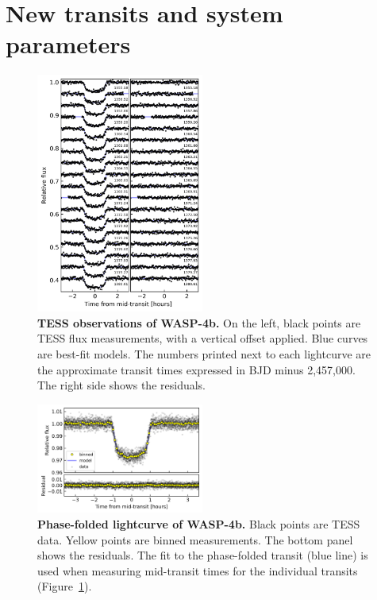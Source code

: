 \documentclass[12pt,twocolumn,tighten]{aastex62}
\begin{document}
\section{New transits and system parameters}
\label{sec:observations}

\begin{figure}[t!]
    \begin{center}
        \includegraphics[width=0.49\textwidth]{f2.png}
    \end{center}
    \vspace{-0.5cm}
    \caption{
      {\bf TESS observations of WASP-4b.} On the left, black points
      are TESS flux measurements, with a vertical offset applied. Blue
      curves are best-fit models. The numbers printed next to each
      lightcurve are the approximate transit times expressed in
      BJD minus 2{,}457{,}000.  The right side shows the
      residuals.
       \label{fig:lightcurves}
    }
\end{figure}

\begin{figure}[t!]
    \begin{center}
        \includegraphics[width=0.49\textwidth]{f1.png}
    \end{center}
    \vspace{-0.5cm}
    \caption{
        {\bf Phase-folded lightcurve of WASP-4b.} Black points are
        TESS data. Yellow points are binned measurements.  The bottom
        panel shows the residuals.  The fit to the phase-folded
        transit (blue line) is used when measuring mid-transit times for
        the individual transits (Figure~\ref{fig:lightcurves}).
        \label{fig:phasefold}
    }
\end{figure}
\end{document}

